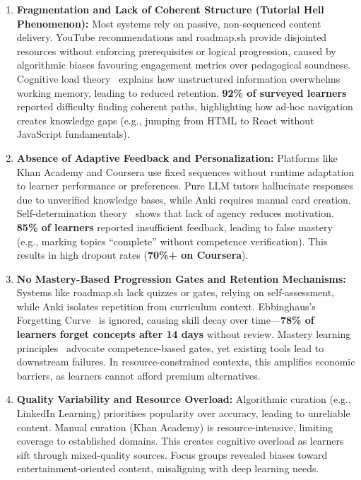 \begin{enumerate}
    \item \textbf{Fragmentation and Lack of Coherent Structure (Tutorial Hell Phenomenon):} Most systems rely on passive, non-sequenced content delivery. YouTube recommendations and roadmap.sh provide disjointed resources without enforcing prerequisites or logical progression, caused by algorithmic biases favouring engagement metrics over pedagogical soundness. Cognitive load theory~\cite{sweller1988} explains how unstructured information overwhelms working memory, leading to reduced retention. \textbf{92\% of surveyed learners} reported difficulty finding coherent paths, highlighting how ad-hoc navigation creates knowledge gaps (e.g., jumping from HTML to React without JavaScript fundamentals).

    \item \textbf{Absence of Adaptive Feedback and Personalization:} Platforms like Khan Academy and Coursera use fixed sequences without runtime adaptation to learner performance or preferences. Pure LLM tutors hallucinate responses due to unverified knowledge bases, while Anki requires manual card creation. Self-determination theory~\cite{deci1985} shows that lack of agency reduces motivation. \textbf{85\% of learners} reported insufficient feedback, leading to false mastery (e.g., marking topics \enquote{complete} without competence verification). This results in high dropout rates (\textbf{70\%+ on Coursera}).

    \item \textbf{No Mastery-Based Progression Gates and Retention Mechanisms:} Systems like roadmap.sh lack quizzes or gates, relying on self-assessment, while Anki isolates repetition from curriculum context. Ebbinghaus's Forgetting Curve~\cite{ebbinghaus1885} is ignored, causing skill decay over time---\textbf{78\% of learners forget concepts after 14 days} without review. Mastery learning principles~\cite{bloom1968} advocate competence-based gates, yet existing tools lead to downstream failures. In resource-constrained contexts, this amplifies economic barriers, as learners cannot afford premium alternatives.

    \item \textbf{Quality Variability and Resource Overload:} Algorithmic curation (e.g., LinkedIn Learning) prioritises popularity over accuracy, leading to unreliable content. Manual curation (Khan Academy) is resource-intensive, limiting coverage to established domains. This creates cognitive overload as learners sift through mixed-quality sources. Focus groups revealed biases toward entertainment-oriented content, misaligning with deep learning needs.
\end{enumerate}

